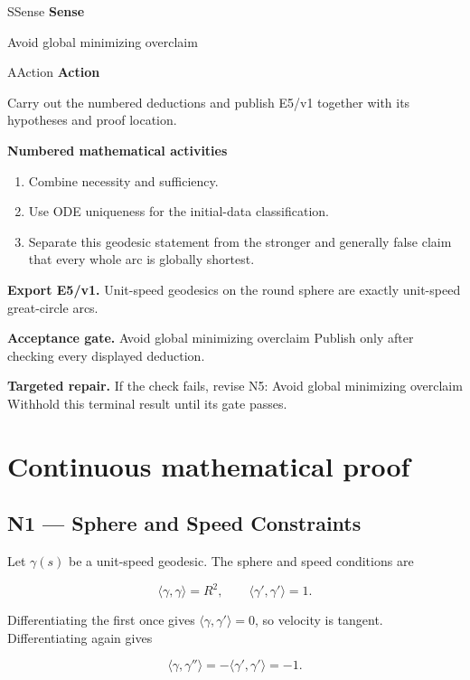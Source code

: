 \documentclass[preprint,12pt,aps,pra,showkeys,amsmath,amssymb,superscriptaddress,floatfix]{revtex4-2}
\theoremstyle{definition}
\theoremstyle{remark}
\newcommand{\mmfaculty}[3]{%
 \begin{mmfacultybox}{#1}{#2}
 {\sffamily\bfseries\color{MMBlue}#2}\par\smallskip #3
 \end{mmfacultybox}}
\newcommand{\field}[2]{\par\smallskip\noindent\textbf{#1.} #2\par}
\begin{document}
\mmfaculty{S}{Sense}{Avoid global minimizing overclaim}

\mmfaculty{A}{Action}{Carry out the numbered deductions and publish E5/v1 together with its
hypotheses and proof location.}

\smallskip\noindent\textbf{Numbered mathematical activities}

\begin{enumerate}[label=N5.\arabic*,leftmargin=3.4em]

\item Combine necessity and sufficiency.

\item Use ODE uniqueness for the initial-data classification.

\item Separate this geodesic statement from the stronger and generally false
claim that every whole arc is globally shortest.

\end{enumerate}

\field{Export E5/v1}{Unit-speed geodesics on the round sphere are exactly unit-speed
great-circle arcs.}

\field{Acceptance gate}{Avoid global minimizing overclaim Publish only after checking every
displayed deduction.}

\field{Targeted repair}{If the check fails, revise N5: Avoid global minimizing overclaim
Withhold this terminal result until its gate passes.}

\endgroup\clearpage\section{Continuous mathematical proof}\label{sec:proof}

\subsection{N1 --- Sphere and Speed
Constraints}\label{n1-sphere-and-speed-constraints}

Let \(\gamma (s)\) be a unit-speed geodesic. The sphere and speed
conditions are

\[\langle\gamma,\gamma\rangle=R^2,\qquad\langle\gamma',\gamma'\rangle=1.\]

Differentiating the first once gives \(\langle\gamma,\gamma'\rangle=0\),
so velocity is tangent. Differentiating again gives

\[\langle\gamma,\gamma''\rangle=-\langle\gamma',\gamma'\rangle=-1.\]
\end{document}
